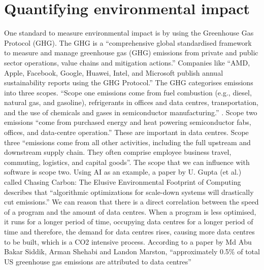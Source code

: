 \section{Quantifying environmental impact}
One standard to measure environmental impact is by using the Greenhouse Gas Protocol (GHG). The GHG is a “comprehensive global standardised framework to measure and manage greenhouse gas (GHG) emissions from private and public sector operations, value chains and mitigation actions.” \cite{GHGProtocol} Companies like “AMD, Apple, Facebook, Google, Huawei, Intel, and Microsoft publish annual sustainability reports using the GHG Protocol.”\cite[p.855]{9407142}  The GHG categorises emissions into three scopes. “Scope one emissions come from fuel combustion (e.g., diesel, natural gas, and gasoline), refrigerants in offices and data centres, transportation, and the use of chemicals and gases in semiconductor manufacturing.” \cite[p.856]{9407142}. Scope two emissions “come from purchased energy and heat powering semiconductor fabs, offices, and data-centre operation.” \cite[p.856]{9407142} These are important in data centres. Scope three “emissions come from all other activities, including the full upstream and downstream supply chain. They often comprise employee business travel, commuting, logistics, and capital goods”. \cite[p.856]{9407142}
The scope that we can influence with software is scope two. Using AI as an example, a paper by U. Gupta (et al.) called Chasing Carbon: The Elusive Environmental Footprint of Computing describes that “algorithmic optimizations for scale-down systems will drastically cut emissions.” \cite[p.863]{9407142}
We can reason that there is a direct correlation between the speed of a program and the amount of data centres. When a program is less optimised, it runs for a longer period of time, occupying data centres for a longer period of time and therefore, the demand for data centres rises, causing more data centres to be built, which is a CO2 intensive process. According to a paper by Md Abu Bakar Siddik, Arman Shehabi and Landon Marston, “approximately 0.5\% of total US greenhouse gas emissions are attributed to data centres” \cite{Siddik_2021}
